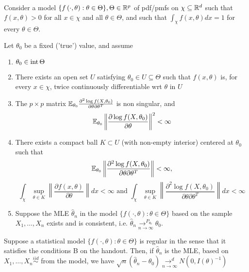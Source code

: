 \documentclass[a4paper]{article}
\begin{document}
\begin{assumption}
	Consider a model $\{f\left( \cdot , \theta \right) : \theta \in \Theta \}, \Theta \in \mathbb{R}^{p}$ of pdf/pmfs on $\chi \subseteq \mathbb{R}^{d}$ such that $f(x, \theta) > 0$ for all  $x \in \chi$ and all $\theta \in \Theta$, and such that $\int_{\chi} f(x, \theta) dx = 1$ for every $\theta \in  \Theta$.

	Let $\theta_0$ be a fixed ('true') value, and assume

	\begin{enumerate}
		\item $\theta_0 \in\operatorname{int}\Theta$
		\item There exists an open set $U$ satisfying $\theta_0 \in U \subseteq \Theta$ such that $f(x, \theta)$ is, for every $x\in \chi$, twice continuously differentiable wrt $\theta$ in $U$
		\item The  $p\times p$ matrix $\mathbb{E}_{\theta_0} \frac{\partial^2 \log f(X, \theta_0)}{\partial \theta \partial \theta^{T}}  $ is non singular, and 
			\[
				\mathbb{E}_{\theta_0} \left\|\frac{\partial \log f(X, \theta_0)}{\partial\theta} \right\|^2 < \infty
			\]
		\item There exists a compact ball $K \subset U$ (with non-empty interior) centered at $\theta_0$ such that
			\[
			\mathbb{E}_{\theta_0} \left\| \frac{\partial^2 \log f(X, \theta_0)}{\partial \theta \partial \theta^{T}} \right\| < \infty
			,\]
			\[
				\int_{\chi} \sup_{\theta \in K} \left\| \frac{\partial f(x, \theta)}{\partial\theta}\right\| dx < \infty \text{ and } \int_{\chi} \sup_{\theta \in  K} \left\| \frac{\partial^2 \log f(X, \theta_0)}{\partial \theta \partial \theta^{T}} \right\| dx < \infty
			\]
			\item Suppose the MLE $\hat{\theta}_n$ in the model $\{f\left( \cdot , \theta \right) : \theta \in \Theta \}$ based on the sample $X_1, \ldots, X_n$ exists and is consistent, i.e. $\hat{\theta}_n \underset{n\to \infty}{\to ^{P_{\theta_{0}}}} \theta_0$.
	\end{enumerate}
\end{assumption}

\begin{thm}
	Suppose a statistical model $\{f\left( \cdot , \theta \right) : \theta \in \Theta \}$ is regular in the sense that it satisfies the conditions B on the handout. Then, if $\hat{\theta}_n$ is the MLE, based on $X_1, \ldots, X_n \stackrel{iid}{\sim}$ from the model, we have $\sqrt{n} (\hat{\theta}_n - \theta_0) \underset{n \to \infty}{\to ^{d}} N(0, I(\theta)^{-1})$
\end{thm}
\end{document}
